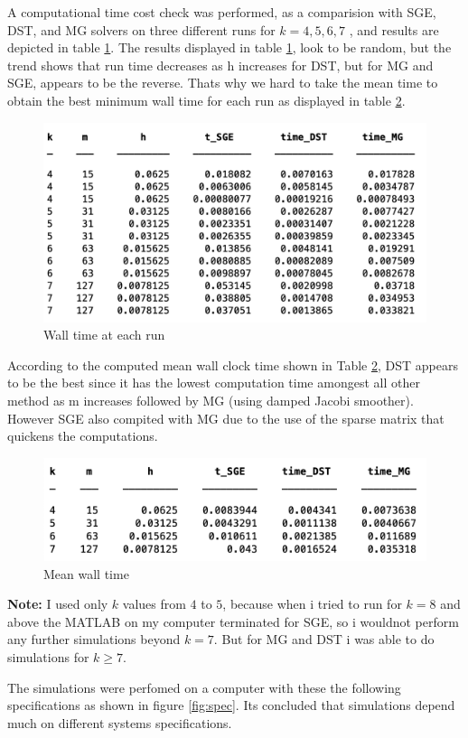 \documentclass[12pt,a4paper]{article}
\begin{document}
\noindent A computational time cost check was performed, as a comparision with SGE, DST, and MG solvers on three different runs for $k = 4,5,6,7$ , and results are depicted in table \ref{fig:walltime}. The results displayed in table \ref{fig:walltime}, look to be random, but the trend shows that run time decreases as h increases for DST, but for MG and SGE, appears to be the reverse. Thats why we hard to take the mean time to obtain the best minimum wall time for each run as displayed in table \ref{fig:meant}.

\begin{figure}[H]
	\centering
	\includegraphics[width=0.7\linewidth]{walltime}
	\caption{Wall time at each run}
	\label{fig:walltime}
\end{figure}

\noindent According to the computed mean wall clock time shown in Table \ref{fig:meant}, DST
appears to be the best since it has the lowest computation time  amongest all other method as m increases followed by MG (using damped Jacobi smoother). However SGE also compited with MG due to the use of the sparse matrix that quickens the computations.
\begin{figure}[H]
	\centering
	\includegraphics[width=0.7\linewidth]{meant}
	\caption{Mean wall time }
	\label{fig:meant}
\end{figure}
\noindent \textbf{Note:} I used only $k$ values from $4$ to $5$, because when i tried to run for $k = 8$ and above  the MATLAB on my computer terminated for SGE, so i wouldnot perform any further simulations beyond $k=7$.  But for MG and DST i was able to do simulations for $k\ge7$.

\noindent The simulations were perfomed on a computer with these the following specifications as shown in figure \ref{fig:spec}. Its concluded that simulations depend much on different systems specifications. 
\end{document}
